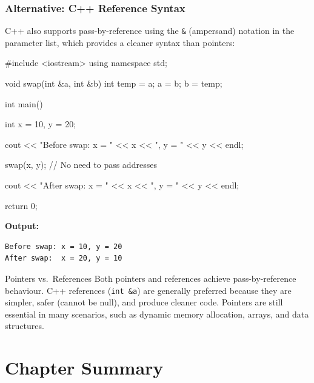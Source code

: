 \subsubsection{Alternative: C++ Reference Syntax}

C++ also supports pass-by-reference using the \texttt{\&} (ampersand)
notation in the parameter list, which provides a cleaner syntax than pointers:

\begin{cppcode}
#include <iostream>
using namespace std;

void swap(int &a, int &b)
{
    int temp = a;
    a = b;
    b = temp;
}

int main()
{
    int x = 10, y = 20;

    cout << "Before swap: x = " << x
         << ", y = " << y << endl;

    swap(x, y);   // No need to pass addresses

    cout << "After swap:  x = " << x
         << ", y = " << y << endl;

    return 0;
}
\end{cppcode}

\noindent\textbf{Output:}
\begin{verbatim}
Before swap: x = 10, y = 20
After swap:  x = 20, y = 10
\end{verbatim}

\begin{infobox}{Pointers vs.\ References}
Both pointers and references achieve pass-by-reference behaviour. C++
references (\texttt{int \&a}) are generally preferred because they are
simpler, safer (cannot be null), and produce cleaner code. Pointers are still
essential in many scenarios, such as dynamic memory allocation, arrays, and
data structures.
\end{infobox}

\section{Chapter Summary}
\label{sec:ch1-summary}

